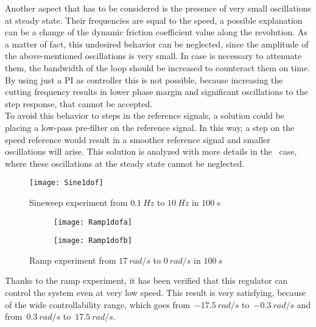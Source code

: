 Another aspect that has to be considered is the presence of very small oscillations at steady state. Their frequencies are equal to the speed, a possible explanation can be a change of the dynamic friction coefficient value along the revolution. As a matter of fact, this undesired behavior can be neglected, since the amplitude of the above-mentioned oscillations is very small. In case is necessary to attenuate them, the bandwidth of the loop should be increased to counteract them on time. By using just a PI as controller this is not possible, because increasing the cutting frequency results in lower phase margin and significant oscillations to the step response, that cannot be accepted. \\
To avoid this behavior to steps in the reference signals, a solution could be placing a low-pass pre-filter on the reference signal. In this way, a step on the speed reference would result in a smoother reference signal and smaller oscillations will arise. This solution is analyzed with more details in the \twodof\ case, where these oscillations at the steady state cannot be neglected.
\begin{figure*}[h]
	\centering
	\texttt{[image: Sine1dof]}
	\caption{Sineweep experiment from $0.1\ Hz$ to $10\ Hz$ in $100\ s$}
	\label{fig:sinesweep_PI_1dof}
\end{figure*}

\begin{figure*}[h]
	\centering
	\begin{subfigure}{0.45\columnwidth}
		\texttt{[image: Ramp1dofa]}
	\end{subfigure}
	\begin{subfigure}{0.45\columnwidth}
		\texttt{[image: Ramp1dofb]}
	\end{subfigure}
	\caption{Ramp experiment from $17\ rad/s$ to $0\ rad/s$ in $100\ s$}
	\label{fig:Ramp1dof}
\end{figure*}

Thanks to the ramp experiment, it has been verified that this regulator can control the system even at very low speed. This result is very satisfying, because of the wide controllability range, which goes from~$-17.5\ rad/s$ to~$-0.3\ rad/s$ and from~$0.3\ rad/s$ to~$17.5\ rad/s$.

\newpage
